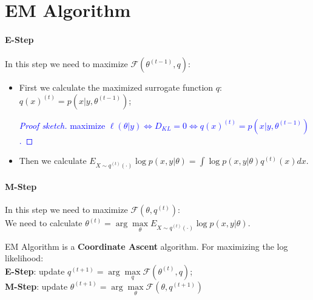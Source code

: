 \documentclass[12pt]{book}
\theoremstyle{definition}
\theoremstyle{remark}
\begin{document}
\newpage
\section{EM Algorithm}
\paragraph{E-Step}
In this step we need to maximize $\mathcal{F}(\theta^{(t-1)},q)$:\\
\begin{itemize}
    \item First we calculate the maximized surrogate function $q$: $q(x)^{(t)} = p(x| y, \theta^{(t-1)})$;
    \textcolor{blue}{
    \begin{proof}[Proof sketch]
        maximize $\ell (\theta|y) \iff D_{KL} = 0 \iff q(x)^{(t)} = p(x| y, \theta^{(t-1)})$.
    \end{proof}
    }
    \item Then we calculate $ E_{X\sim q^{(t)}(\cdot)}\log p(x,y|\theta) = \int\log p(x,y|\theta)q^{(t)}(x)dx$.
\end{itemize}

\paragraph{M-Step}
In this step we need to maximize $\mathcal{F}(\theta,q^{(t)})$:\\
We need to calculate $\theta^{(t)} = \arg \underset{\theta}{\max}E_{X\sim q^{(t)}(\cdot)}\log p(x,y|\theta)$.


\begin{notionbox}[Note]
    EM Algorithm is a \textbf{Coordinate Ascent} algorithm. For maximizing the log likelihood:\\
    
    \textbf{E-Step}:
    update $q^{(t+1)} = \arg\underset{q}{\max}\mathcal{F}(\theta^{(t)}, q)$;\\
    
    \textbf{M-Step}: 
    update $\theta^{(t+1)} = \arg\underset{\theta}{\max}\mathcal{F}(\theta, q^{(t+1)})$
\end{notionbox}
\end{document}
